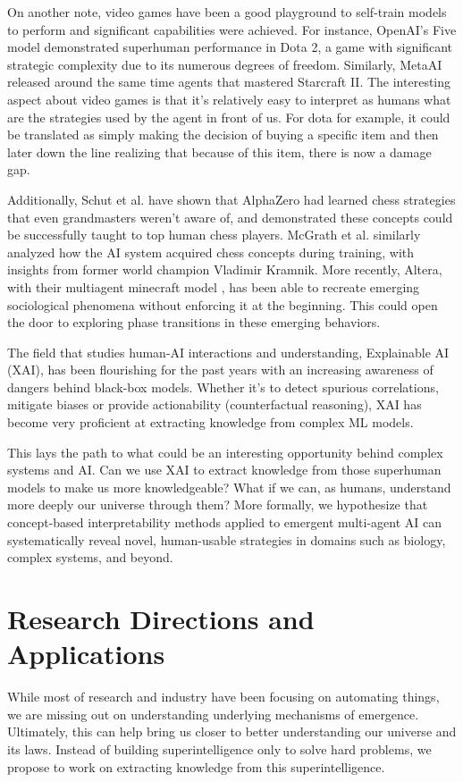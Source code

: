 \documentclass[11pt]{article}
\begin{document}
On another note, video games have been a good playground to self-train models to perform and significant capabilities were achieved.
For instance, OpenAI's Five model demonstrated superhuman performance in Dota 2, a game with significant strategic complexity due to its numerous degrees of freedom. Similarly, MetaAI released around the same time agents that mastered Starcraft II.
The interesting aspect about video games is that it's relatively easy to interpret as humans what are the strategies used by the agent in front of us. For dota for example, it could be translated as simply making the decision of buying a specific item and then later down the line realizing that because of this item, there is now a damage gap.

Additionally, Schut et al. \cite{schut} have shown that AlphaZero had learned chess strategies that even grandmasters weren't aware of, and demonstrated these concepts could be successfully taught to top human chess players. McGrath et al. \cite{alphazero-chess} similarly analyzed how the AI system acquired chess concepts during training, with insights from former world champion Vladimir Kramnik.
More recently, Altera, with their multiagent minecraft model \cite{altera}, has been able to recreate emerging sociological phenomena without enforcing it at the beginning. This could open the door to exploring phase transitions in these emerging behaviors.

The field that studies human-AI interactions and understanding, Explainable AI (XAI), has been flourishing for the past years with an increasing awareness of dangers behind black-box models. Whether it's to detect spurious correlations, mitigate biases or provide actionability (counterfactual reasoning), XAI has become very proficient at extracting knowledge from complex ML models.

This lays the path to what could be an interesting opportunity behind complex systems and AI. Can we use XAI to extract knowledge from those superhuman models to make us more knowledgeable? What if we can, as humans, understand more deeply our universe through them?
More formally, we hypothesize that concept-based interpretability methods applied to emergent multi-agent AI can systematically reveal novel, human-usable strategies in domains such as biology, complex systems, and beyond.

\section{Research Directions and Applications}
While most of research and industry have been focusing on automating things, we are missing out on understanding underlying mechanisms of emergence. Ultimately, this can help bring us closer to better understanding our universe and its laws.
Instead of building superintelligence only to solve hard problems, we propose to work on extracting knowledge from this superintelligence.
\end{document}
